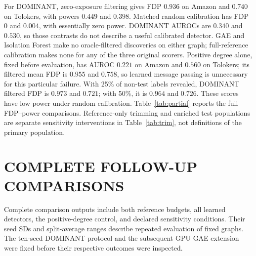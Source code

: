 \documentclass[twoside]{article}
\begin{document}
For DOMINANT, zero-exposure filtering gives FDP $0.936$ on Amazon and $0.740$ on Tolokers, with powers $0.449$ and $0.398$. Matched random calibration has FDP $0$ and $0.004$, with essentially zero power. DOMINANT AUROCs are $0.340$ and $0.530$, so those contrasts do not describe a useful calibrated detector. GAE and Isolation Forest make no oracle-filtered discoveries on either graph; full-reference calibration makes none for any of the three original scorers. Positive degree alone, fixed before evaluation, has AUROC $0.221$ on Amazon and $0.560$ on Tolokers; its filtered mean FDP is $0.955$ and $0.758$, so learned message passing is unnecessary for this particular failure. With 25\% of non-test labels revealed, DOMINANT filtered FDP is $0.973$ and $0.721$; with 50\%, it is $0.964$ and $0.726$. These scores have low power under random calibration. Table~\ref{tab:partial} reports the full FDP--power comparisons. Reference-only trimming and enriched test populations are separate sensitivity interventions in Table~\ref{tab:trim}, not definitions of the primary population.

\section{COMPLETE FOLLOW-UP COMPARISONS}
\label{app:followup}
\begin{table}[t]
\centering\small
\caption{Untrimmed DOMINANT comparisons, reported as mean FDP / power across all ten seeds, five splits, and 200 calibration draws. The 25\% and 50\% rows reveal only non-test labels. The 100\% row is the oracle intervention, which can use test-neighbor labels. Mixture composition is fixed in advance.}
\label{tab:partial}
\end{table}
\begin{table}[t]
\centering\small
\caption{DOMINANT trimming and target-population sensitivity. Natural-prevalence reference-only trimming preserves test identities. Enriched-test rows include every anomaly and 2,000 normal test nodes; trimming both pools can also change test identities and reference size. Amazon uses verified labels throughout this table. All entries average ten seeds, five splits, and 200 calibration draws.}
\label{tab:trim}
\end{table}
Complete comparison outputs include both reference budgets, all learned detectors, the positive-degree control, and declared sensitivity conditions. Their seed SDs and split-average ranges describe repeated evaluation of fixed graphs. The ten-seed DOMINANT protocol and the subsequent GPU GAE extension were fixed before their respective outcomes were inspected.
\end{document}
